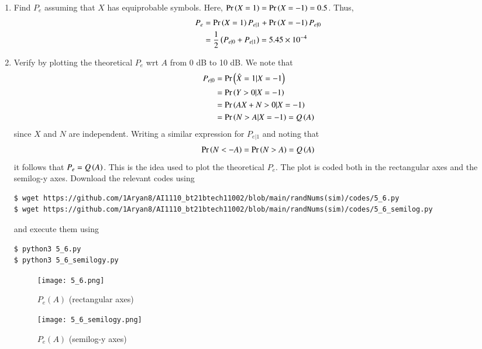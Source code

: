 \documentclass[journal,12pt,twocolumn]{IEEEtran}
\renewcommand\thesection{\arabic{section}}
\begin{document}
\begin{enumerate}[label=\thesection.\arabic*
,ref=\thesection.\theenumi]
\solution
Letting $X = 1$ and $X = -1$ respectively, we see the number of mismatched data points to compute the error probabilities. The simulation is coded in
\begin{lstlisting}
$ wget https://github.com/1Aryan8/AI1110_bt21btech11002/blob/main/randNums(sim)/codes/5_4.py
\end{lstlisting}
and can be run by typing
\begin{lstlisting}
$ python3 5_4.py
\end{lstlisting}
The results are
		\begin{align}
			P_{e|0} = 5.33 \times 10^{-4} \\
			P_{e|1} = 5.57 \times 10^{-4}
		\end{align}

\item Find $P_e$ assuming that $X$ has equiprobable symbols.
\solution
Here, $\Pr\left(X = 1\right) = \Pr\left(X = -1\right) = 0.5$. Thus,
	\begin{align}
		P_e &= \Pr\left(X = 1\right)P_{e|1} + \Pr\left(X = -1\right)P_{e|0} \label{eq:pe-gen} \\
		&= \frac{1}{2}\left(P_{e|0} + P_{e|1}\right) = 5.45 \times 10^{-4}
	\end{align}
	
\item Verify by plotting the theoretical $P_e$ wrt $A$ from 0 dB to 10 dB.
\solution
We note that 
\begin{align}
	P_{e|0} &= \Pr\left(\hat{X} = 1 | X = -1\right)\\
	&= \Pr\left(Y > 0 | X = -1\right) \\
	&= \Pr\left(AX + N > 0 | X = -1\right) \label{eq:thresh} \\
	&= \Pr\left(N > A | X = -1\right) = Q\left(A\right)
\end{align}
since $X$ and $N$ are independent. Writing a similar expression for $P_{e|1}$ and noting that 
\begin{align}
	\Pr\left(N < -A\right) = \Pr\left(N > A\right) = Q\left(A\right)
\end{align}
it follows that $P_e = Q\left(A\right)$. This is the idea used to plot the theoretical $P_e$. The plot is coded both in the rectangular axes and the semilog-y axes. Download the relevant codes using 
\begin{lstlisting}
$ wget https://github.com/1Aryan8/AI1110_bt21btech11002/blob/main/randNums(sim)/codes/5_6.py
$ wget https://github.com/1Aryan8/AI1110_bt21btech11002/blob/main/randNums(sim)/codes/5_6_semilog.py
\end{lstlisting}
and execute them using
\begin{lstlisting}
$ python3 5_6.py
$ python3 5_6_semilogy.py
\end{lstlisting}
\begin{figure}[!htb]
	\texttt{[image: 5\_6.png]}
	\caption{$P_e(A)$ (rectangular axes)}
	\label{fig:ber-snr}
\end{figure}
\begin{figure}[!htb]
	\texttt{[image: 5\_6\_semilogy.png]}
	\caption{$P_e(A)$ (semilog-y axes)}
	\label{fig:ber-snr-semilog}
\end{figure}


\end{enumerate}
\end{document}
